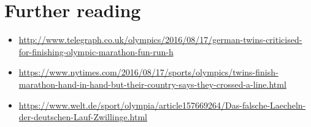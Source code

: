 \documentclass[12pt,titlepage]{article}
\begin{document}
\section*{Further reading}

\begin{itemize}

\item \url{http://www.telegraph.co.uk/olympics/2016/08/17/german-twins-criticised-for-finishing-olympic-marathon-fun-run-h}

\item
  \url{https://www.nytimes.com/2016/08/17/sports/olympics/twins-finish-marathon-hand-in-hand-but-their-country-says-they-crossed-a-line.html}

\item
  \url{https://www.welt.de/sport/olympia/article157669264/Das-falsche-Laecheln-der-deutschen-Lauf-Zwillinge.html}
\end{itemize}
\end{document}
